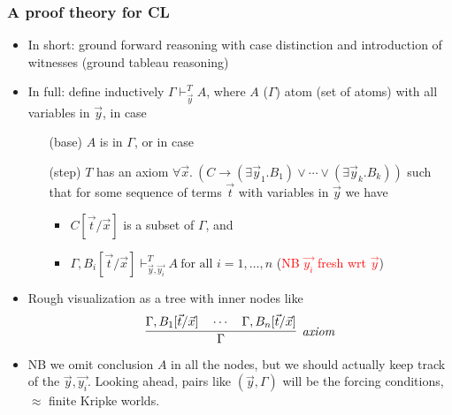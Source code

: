 \documentclass[handout,11pt]{beamer}
\newcommand{\red}[1]{\textcolor{red}{#1}}
\begin{document}
\begin{frame}
\frametitle{A proof theory for CL}
 \begin{itemize}[<+->]   %
    \item In short: ground forward reasoning with case distinction and
    introduction of witnesses (ground tableau reasoning)
    \item In full: define inductively $\Gamma\vdash_{\vec{y}}^T A$, where 
    $A$ ($\Gamma$) atom (set of atoms) with all variables in $\vec{y}$, in case
    \begin{enumerate}
    \item[(base)] $A$ is in $\Gamma$, or in case 
    \item[(step)] $T$ has an axiom $\forall\vec{x}.~
    (C \to (\exists\vec{y}_1.B_1) \lor \cdots \lor (\exists\vec{y}_k.B_k))$
    such that for some sequence of terms $\vec{t}$ with variables in $\vec{y}$
    we have
    \begin{itemize}
    \item $C[\vec{t}/\vec{x}]$ is a subset of $\Gamma$, and
    \item $\Gamma,B_i[\vec{t}/\vec{x}]\vdash^T_{\vec{y},\vec{y_i}} A
          ~\text{for all $i = 1,\dots,n$}$ \quad
          (\red{NB $\vec{y_i}$ fresh wrt $\vec{y}$})
    \end{itemize}
    \end{enumerate}
    \item Rough visualization as a tree with inner nodes like 
    \[
\infer[\mathit{axiom}]{\Gamma}{\Gamma,B_1[\vec{t}/\vec{x}] \quad\cdots\quad \Gamma,B_n[\vec{t}/\vec{x}]}
    \]
    \item NB we omit conclusion $A$ in all the nodes, 
    but we should actually keep track of the $\vec{y},\vec{y_i}$.
    Looking ahead, pairs like $(\vec{y},\Gamma)$ will be
    the forcing conditions, $\approx$ finite Kripke worlds.
 \end{itemize}
\end{frame}
\end{document}
